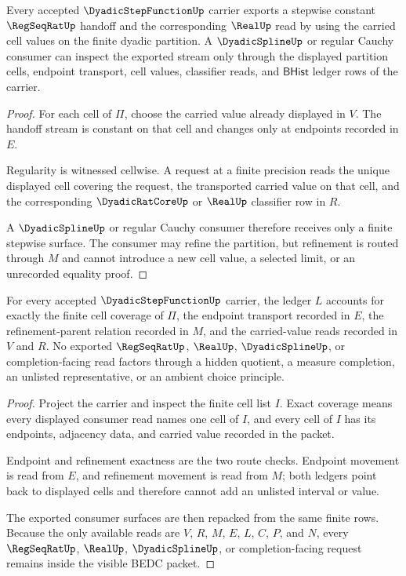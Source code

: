 \begin{theorem}
\label{thm:dyadic-step-function-regseqrat-handoff}
Every accepted $\DyadicStepFunctionUp$ carrier exports a stepwise constant $\RegSeqRatUp$ handoff and the corresponding $\RealUp$ read by using the carried cell values on the finite dyadic partition. A $\DyadicSplineUp$ or regular Cauchy consumer can inspect the exported stream only through the displayed partition cells, endpoint transport, cell values, classifier reads, and $\mathsf{BHist}$ ledger rows of the carrier.
\end{theorem}
\begin{proof}
For each cell of $\Pi$, choose the carried value already displayed in $V$. The handoff stream is constant on that cell and changes only at endpoints recorded in $E$.

Regularity is witnessed cellwise. A request at a finite precision reads the unique displayed cell covering the request, the transported carried value on that cell, and the corresponding $\DyadicRatCoreUp$ or $\RealUp$ classifier row in $R$.

A $\DyadicSplineUp$ or regular Cauchy consumer therefore receives only a finite stepwise surface. The consumer may refine the partition, but refinement is routed through $M$ and cannot introduce a new cell value, a selected limit, or an unrecorded equality proof.
\end{proof}

\begin{theorem}
\label{thm:dyadic-step-function-ledger-exactness}
For every accepted $\DyadicStepFunctionUp$ carrier, the ledger $L$ accounts for exactly the finite cell coverage of $\Pi$, the endpoint transport recorded in $E$, the refinement-parent relation recorded in $M$, and the carried-value reads recorded in $V$ and $R$. No exported $\RegSeqRatUp$, $\RealUp$, $\DyadicSplineUp$, or completion-facing read factors through a hidden quotient, a measure completion, an unlisted representative, or an ambient choice principle.
\end{theorem}
\begin{proof}
Project the carrier and inspect the finite cell list $I$. Exact coverage means every displayed consumer read names one cell of $I$, and every cell of $I$ has its endpoints, adjacency data, and carried value recorded in the packet.

Endpoint and refinement exactness are the two route checks. Endpoint movement is read from $E$, and refinement movement is read from $M$; both ledgers point back to displayed cells and therefore cannot add an unlisted interval or value.

The exported consumer surfaces are then repacked from the same finite rows. Because the only available reads are $V$, $R$, $M$, $E$, $L$, $C$, $P$, and $N$, every $\RegSeqRatUp$, $\RealUp$, $\DyadicSplineUp$, or completion-facing request remains inside the visible BEDC packet.
\end{proof}


